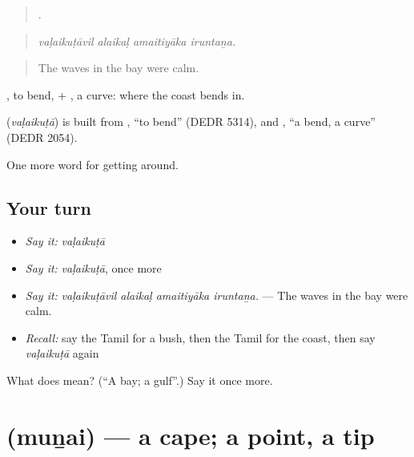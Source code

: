\begin{quote}
   .
\end{quote}

\begin{quote}
\emph{vaḷaikuṭāvil alaikaḷ amaitiyāka iruntaṉa.}
\end{quote}

\begin{quote}
The waves in the bay were calm.
\end{quote}

, to bend, + , a curve: where the coast bends in.

\begin{cousinweb}
\textbf{} (\emph{vaḷaikuṭā}) is built from , \textquotedblleft{}to bend\textquotedblright{} (DEDR 5314), and , \textquotedblleft{}a bend, a curve\textquotedblright{} (DEDR 2054).
\end{cousinweb}

\begin{grammarlens}[title={What you've built}]
One more word for getting around.
\end{grammarlens}

\subsection*{Your turn}
\begin{itemize}
\raggedright
  \item \emph{Say it:} \emph{vaḷaikuṭā}
  \item \emph{Say it:} \emph{vaḷaikuṭā}, once more
  \item \emph{Say it:} \emph{vaḷaikuṭāvil alaikaḷ amaitiyāka iruntaṉa.} — The waves in the bay were calm.
  \item \emph{Recall:} say the Tamil for a bush, then the Tamil for the coast, then say \emph{vaḷaikuṭā} again
\end{itemize}

\begin{tcolorbox}[breakable,colback=teal!4,colframe=teal!35!black,title={Before you move on}]
What does  mean? (\textquotedblleft{}A bay; a gulf\textquotedblright{}.) Say it once more.
\end{tcolorbox}
\section[\texorpdfstring{\ta{முனை} (muṉai)}{முனை (muṉai)}]{ (muṉai) — a cape; a point, a tip}

